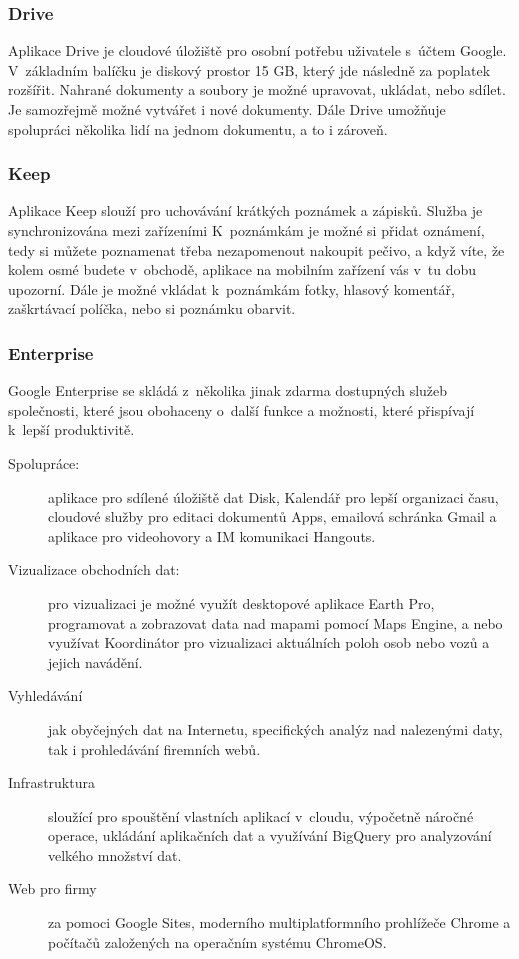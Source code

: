 \subsubsection{Drive}
Aplikace Drive je cloudové úložiště pro osobní potřebu uživatele s~účtem Google. V~základním balíčku je diskový prostor 15 GB, který jde následně za poplatek rozšířit. Nahrané dokumenty a soubory je možné upravovat, ukládat, nebo sdílet. Je samozřejmě možné vytvářet i nové dokumenty. Dále Drive umožňuje spolupráci několika lidí na jednom dokumentu, a to i zároveň.

\subsubsection{Keep}
Aplikace Keep slouží pro uchovávání krátkých poznámek a zápisků. Služba je synchronizována mezi zařízeními K~poznámkám je možné si přidat oznámení, tedy si můžete poznamenat třeba nezapomenout nakoupit pečivo, a když víte, že kolem osmé budete v~obchodě, aplikace na mobilním zařízení vás v~tu dobu upozorní. Dále je možné vkládat k~poznámkám fotky, hlasový komentář, zaškrtávací políčka, nebo si poznámku obarvit.

\subsubsection{Enterprise}
Google Enterprise se skládá z~několika jinak zdarma dostupných služeb společnosti, které jsou obohaceny o~další funkce a možnosti, které přispívají k~lepší produktivitě.
\begin{description}
	\item[Spolupráce:] aplikace pro sdílené úložiště dat Disk, Kalendář pro lepší organizaci času, cloudové služby pro editaci dokumentů Apps, emailová schránka Gmail a aplikace pro videohovory a IM komunikaci Hangouts.
	\item[Vizualizace obchodních dat:] pro vizualizaci je možné využít desktopové aplikace Earth Pro, programovat a zobrazovat data nad mapami pomocí Maps Engine, a nebo využívat Koordinátor pro vizualizaci aktuálních poloh osob nebo vozů a jejich navádění.
	\item[Vyhledávání] jak obyčejných dat na Internetu, specifických analýz nad nalezenými daty, tak i prohledávání firemních webů.
	\item[Infrastruktura] sloužící pro spouštění vlastních aplikací v~cloudu, výpočetně náročné operace, ukládání aplikačních dat a využívání BigQuery pro analyzování velkého množství dat.
	\item[Web pro firmy] za pomoci Google Sites, moderního multiplatformního prohlížeče Chrome a počítačů založených na operačním systému ChromeOS.
\end{description}

